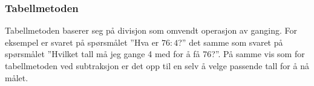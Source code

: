 \subsubsection{Tabellmetoden}
Tabellmetoden baserer seg på divisjon som omvendt operasjon av ganging. For eksempel er svaret på spørsmålet ''Hva er $ {76:4} $?'' det samme som svaret på spørsmålet ''Hvilket tall må jeg gange 4 med for å få 76?''. På samme vis som for tabellmetoden ved subtraksjon er det opp til en selv å velge passende tall for å nå målet.
\begin{center}
	\label{ekstbldiv}
	\parbox{0.35\linewidth}{
		} \qquad
\parbox{0.35\linewidth}{
	} \vsk

\parbox{0.415\linewidth}{
}
\end{center}
\newpage
